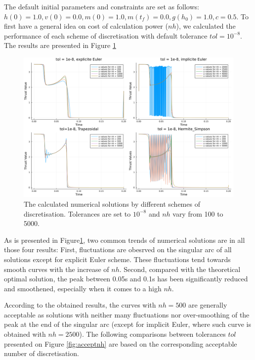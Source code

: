\documentclass{article}
\begin{document}
The default initial parameters and constraints are set as follows: $h(0)=1.0, v(0)=0.0, m(0)=1.0, m(t_f)=0.0, g(h_0)=1.0, c = 0.5$. To first have a general idea on cost of calculation power ($nh$), we calculated the performance of each scheme of discretisation with default tolerance $tol = 10^{-8}$. The results are presented in Figure \ref{fig:defaulttol}
\begin{figure}[ht]
    \centering
    \includegraphics[width = \textwidth]{default tol.png}
    \caption{\label{fig:defaulttol} The calculated numerical solutions by different schemes of discretisation. Tolerances are set to $10^{-8}$ and $nh$ vary from 100 to 5000.}
\end{figure}

As is presented in Figure\ref{fig:defaulttol}, two common trends of numerical solutions are in all those four results: First, fluctuations are obesrved on the singular arc of all solutions except for explicit Euler scheme. These fluctuations tend towards smooth curves with the increase of $nh$. Second, compared with the theoretical optimal solution, the peak between 0.05s and 0.1s has been significantly reduced and smoothened, especially when it comes to a high $nh$.

According to the obtained results, the curves with $nh = 500$ are generally acceptable as solutions with neither many fluctuations nor over-smoothing of the peak at the end of the singular arc (except for implicit Euler, where such curve is obtained with $nh = 2500$). The following comparisons between tolerances $tol$ presented on Figure \ref{fig:acceptnh} are based on the corresponding acceptable number of discretisation.
\end{document}

